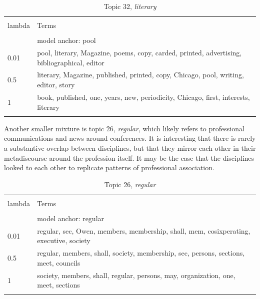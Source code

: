 \documentclass[]{book}
\theoremstyle{definition}
\theoremstyle{definition}
\theoremstyle{definition}
\theoremstyle{remark}
\begin{document}
\begin{table}[!htbp] \centering 
  \caption{Topic 32, \emph{literary}} 
  \label{tab:t32-m} 
\begin{tabularx}{\textwidth}{@{\extracolsep{5pt}} lY} 
\\[-1.8ex]\hline 
\hline \\[-1.8ex] 
lambda & Terms \\ 
\hline \\[-1.8ex] 
 & model anchor: pool \\ 
0.01 & pool, literary, Magazine, poems, copy, carded, printed, advertising, bibliographical, editor \\ 
0.5 & literary, Magazine, published, printed, copy, Chicago, pool, writing, editor, story \\ 
1 & book, published, one, years, new, periodicity, Chicago, first, interests, literary \\ 
\hline \\[-1.8ex] 
\end{tabularx} 
\end{table}

Another smaller mixture is topic 26, \emph{regular}, which likely refers
to professional communications and news around conferences. It is
interesting that there is rarely a substantive overlap between
disciplines, but that they mirror each other in their metadiscourse
around the profession itself. It may be the case that the disciplines
looked to each other to replicate patterns of professional association.



\begin{table}[!htbp] \centering 
  \caption{Topic 26, \emph{regular}} 
  \label{tab:t26-m} 
\begin{tabularx}{\textwidth}{@{\extracolsep{5pt}} lY} 
\\[-1.8ex]\hline 
\hline \\[-1.8ex] 
lambda & Terms \\ 
\hline \\[-1.8ex] 
 & model anchor: regular \\ 
0.01 & regular, sec, Owen, members, membership, shall, mem, cosixperating, executive, society \\ 
0.5 & regular, members, shall, society, membership, sec, persons, sections, meet, councils \\ 
1 & society, members, shall, regular, persons, may, organization, one, meet, sections \\ 
\hline \\[-1.8ex] 
\end{tabularx} 
\end{table}
\end{document}
